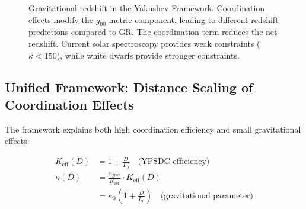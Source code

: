 \documentclass[11pt,a4paper]{article}
\begin{document}
\begin{figure}[htbp]
{
		}
		\caption{Gravitational redshift in the Yakushev Framework. Coordination effects modify the $g_{00}$ metric component, leading to different redshift predictions compared to GR. The coordination term reduces the net redshift. Current solar spectroscopy provides weak constraints ($\kappa < 150$), while white dwarfs provide stronger constraints.}
		\label{fig:redshift-detailed}
	\end{figure}
\subsection{Unified Framework: Distance Scaling of Coordination Effects}

The framework explains both high coordination efficiency and small gravitational effects:

\begin{align}
	K_{\mathrm{eff}}(D) &= 1 + \frac{D}{L_0} \quad \text{(YPSDC efficiency)} \\
	\kappa(D) &= \frac{\alpha_{\text{grav}}}{K_{\text{ref}}} \cdot K_{\mathrm{eff}}(D) \\
	&= \kappa_0 \left(1 + \frac{D}{L_0}\right) \quad \text{(gravitational parameter)}
\end{align}
\end{document}
